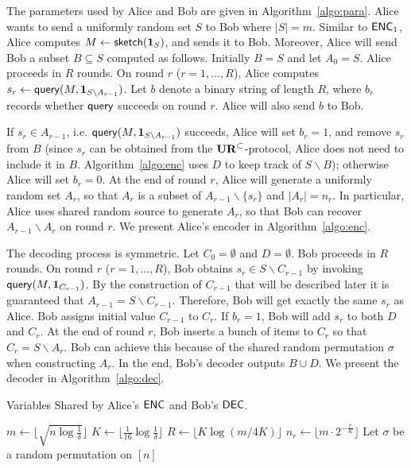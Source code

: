 The parameters used by Alice and Bob are given in Algorithm~\ref{algo:para}.
Alice wants to send a uniformly random set $S$ to Bob where $|S|=m$. 
Similar to $\textsf{ENC}_1$, Alice computes $M \leftarrow \mathsf{sketch}(\mathbf{1}_S)$, and sends it to Bob. 
Moreover, Alice will send Bob a subset $B\subseteq S$ computed as follows.
Initially $B=S$ and let $A_0=S$. Alice proceeds in $R$ rounds. 
On round $r$ ($r=1,\ldots, R$), Alice computes $s_r\leftarrow \mathsf{query}(M, \mathbf{1}_{S\backslash A_{r-1}})$. 
Let $b$ denote a binary string of length $R$, where $b_r$ records whether $\mathsf{query}$ succeeds on round $r$. 
Alice will also send $b$ to Bob.
 
If $s_r\in A_{r-1}$, i.e. $\mathsf{query}(M, \mathbf{1}_{S\backslash A_{r-1}})$ succeeds, Alice will set $b_r=1$, and remove $s_r$ from $B$ (since $s_r$ can be obtained from the $\mathbf{UR}^\subset$-protocol, Alice does not need to include it in $B$. Algorithm~\ref{algo:enc} uses $D$ to keep track of $S\backslash B$); otherwise Alice will set $b_r=0$.
At the end of round $r$, Alice will generate a uniformly random set $A_r$, so that $A_r$ is a subset of $A_{r-1}\backslash \{s_r\}$ and $|A_r|=n_r$. 
In particular, Alice uses shared random source to generate $A_r$, so that Bob can recover $A_{r-1}\backslash A_r$ on round $r$. 
We present Alice's encoder in Algorithm~\ref{algo:enc}.

The decoding process is symmetric. 
Let $C_0=\emptyset$ and $D=\emptyset$. 
Bob proceeds in $R$ rounds. 
On round $r$ ($r=1,\ldots,R$), Bob obtains $s_r\in S\backslash C_{r-1}$ by invoking $\mathsf{query}(M, \mathbf{1}_{C_{r-1}})$. 
By the construction of $C_{r-1}$ that will be described later it is guaranteed that $A_{r-1}=S\backslash C_{r-1}$. 
Therefore, Bob will get exactly the same $s_r$ as Alice. 
Bob assigns initial value $C_{r-1}$ to $C_r$.
If $b_r=1$, Bob will add $s_r$ to both $D$ and $C_r$.
At the end of round $r$, Bob inserts a bunch of items to $C_r$ so that $C_r=S\backslash A_r$. 
Bob can achieve this because of the shared random permutation $\sigma$ when constructing $A_r$.
In the end, Bob's decoder outputs $B\cup D$.
We present the decoder in Algorithm~\ref{algo:dec}.

\begin{algorithm}[H] 
  \caption{Variables Shared by Alice's $\textsf{ENC}$ and Bob's $\textsf{DEC}$.} \label{algo:para}
  \begin{algorithmic}[1] 
    \State $m\leftarrow \lfloor \sqrt{n \log\frac{1}{\delta}} \rfloor$ 
    \State $K\leftarrow \lfloor \frac{1}{16}\log \frac{1}{\delta} \rfloor$
    \State $R\leftarrow \lfloor K\log(m/4K) \rfloor$
      \State $n_r\leftarrow \lfloor m \cdot 2^{-\frac{r}{K}} \rfloor$ 
    \EndFor
    \State Let $\sigma$ be a random permutation on $[n]$ 
  \end{algorithmic}
\end{algorithm}

